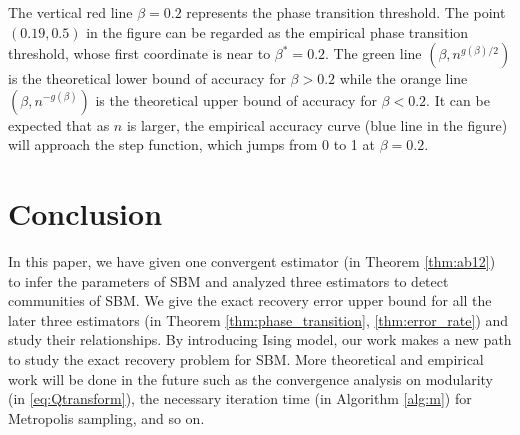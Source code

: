 \documentclass[journal]{IEEEtran}
\newcommand{\1}{\mathbbm{1}}
\begin{document}
The vertical red line $\beta=0.2$ represents the phase transition threshold. The point $(0.19,0.5)$ in the figure
can be regarded as the empirical phase transition threshold, whose first coordinate is near to $\beta^* = 0.2$.
The green line $(\beta, n^{g(\beta)/2})$ is the theoretical lower bound of accuracy for $\beta>0.2$ while the orange line
$(\beta, n^{-g(\beta)})$ is the theoretical upper bound of accuracy for $\beta < 0.2$. It can be expected that
as $n$ is larger, the empirical accuracy curve (blue line in the figure) will approach the step function, which jumps from
0 to 1 at $\beta=0.2$.
\section{Conclusion}
In this paper, we have given one convergent estimator (in Theorem \ref{thm:ab12}) to infer the parameters of SBM and analyzed three estimators to detect communities of SBM.
We give the exact recovery error upper bound for all the later three estimators (in Theorem \ref{thm:phase_transition}, \ref{thm:error_rate})
and study their relationships. By introducing Ising model, our work makes a new path to study the exact recovery problem for SBM. More
theoretical and empirical work will be done in the future such as the convergence analysis on modularity (in \eqref{eq:Qtransform}), the necessary iteration time (in Algorithm \ref{alg:m}) for Metropolis sampling, and so on.
\appendix
\end{document}
